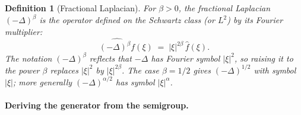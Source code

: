 \documentclass[11pt]{article}
\newtheorem{definition}{Definition}
\begin{document}
\begin{definition}[Fractional Laplacian]\label{def:frac_lap}
For $\beta>0$, the \emph{fractional Laplacian} $(-\Delta)^{\beta}$ is the operator defined on the Schwartz class (or $L^2$) by its Fourier multiplier:
\begin{equation}\label{eq:frac_lap_def}
\widehat{(-\Delta)^{\beta} f}(\xi) \;=\; |\xi|^{2\beta}\,\hat f(\xi).
\end{equation}
The notation $(-\Delta)^{\beta}$ reflects that $-\Delta$ has Fourier symbol $|\xi|^2$, so raising it to the power $\beta$ replaces $|\xi|^2$ by $|\xi|^{2\beta}$. The case $\beta=1/2$ gives $(-\Delta)^{1/2}$ with symbol $|\xi|$; more generally $(-\Delta)^{\alpha/2}$ has symbol $|\xi|^\alpha$.
\end{definition}

\paragraph{Deriving the generator from the semigroup.}
\end{document}
